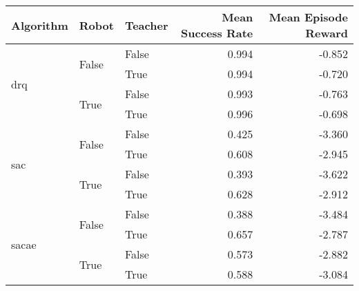 \begin{tabular}{lllrr}
\toprule
Algorithm & Robot & Teacher & Mean Success Rate & Mean Episode Reward \\
\midrule
\multirow{4}{*}{drq} & \multirow{2}{*}{False} & False &             0.994 &      -0.852 \\
      &      & True &             0.994 &      -0.720 \\
\cline{2-5}
      & \multirow{2}{*}{True} & False &             0.993 &      -0.763 \\
      &      & True &             0.996 &      -0.698 \\
\cline{1-5}
\cline{2-5}
\multirow{4}{*}{sac} & \multirow{2}{*}{False} & False &             0.425 &      -3.360 \\
      &      & True &             0.608 &      -2.945 \\
\cline{2-5}
      & \multirow{2}{*}{True} & False &             0.393 &      -3.622 \\
      &      & True &             0.628 &      -2.912 \\
\cline{1-5}
\cline{2-5}
\multirow{4}{*}{sacae} & \multirow{2}{*}{False} & False &             0.388 &      -3.484 \\
      &      & True &             0.657 &      -2.787 \\
\cline{2-5}
      & \multirow{2}{*}{True} & False &             0.573 &      -2.882 \\
      &      & True &             0.588 &      -3.084 \\
\bottomrule
\end{tabular}